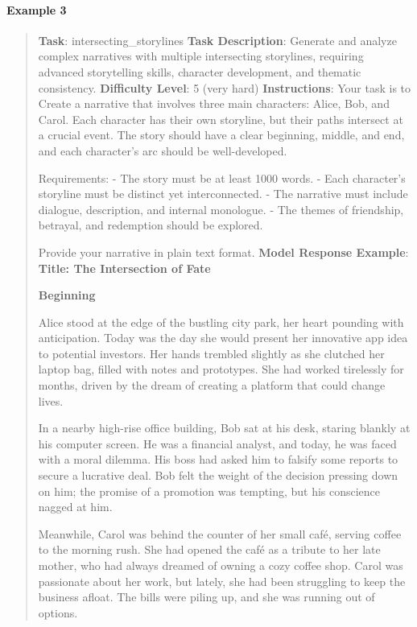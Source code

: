 \documentclass[fleqn,10pt]{wlscirep}
\begin{document}
\hypertarget{example-3-8}{%
\paragraph{Example 3}\label{example-3-8}}

\begin{quote}
\textbf{Task}: intersecting\_storylines \textbf{Task Description}:
Generate and analyze complex narratives with multiple intersecting
storylines, requiring advanced storytelling skills, character
development, and thematic consistency. \textbf{Difficulty Level}: 5
(very hard) \textbf{Instructions}: Your task is to Create a narrative
that involves three main characters: Alice, Bob, and Carol. Each
character has their own storyline, but their paths intersect at a
crucial event. The story should have a clear beginning, middle, and end,
and each character's arc should be well-developed.

Requirements: - The story must be at least 1000 words. - Each
character's storyline must be distinct yet interconnected. - The
narrative must include dialogue, description, and internal monologue. -
The themes of friendship, betrayal, and redemption should be explored.

Provide your narrative in plain text format. \textbf{Model Response
Example}: \textbf{Title: The Intersection of Fate}

\textbf{Beginning}

Alice stood at the edge of the bustling city park, her heart pounding
with anticipation. Today was the day she would present her innovative
app idea to potential investors. Her hands trembled slightly as she
clutched her laptop bag, filled with notes and prototypes. She had
worked tirelessly for months, driven by the dream of creating a platform
that could change lives.

In a nearby high-rise office building, Bob sat at his desk, staring
blankly at his computer screen. He was a financial analyst, and today,
he was faced with a moral dilemma. His boss had asked him to falsify
some reports to secure a lucrative deal. Bob felt the weight of the
decision pressing down on him; the promise of a promotion was tempting,
but his conscience nagged at him.

Meanwhile, Carol was behind the counter of her small café, serving
coffee to the morning rush. She had opened the café as a tribute to her
late mother, who had always dreamed of owning a cozy coffee shop. Carol
was passionate about her work, but lately, she had been struggling to
keep the business afloat. The bills were piling up, and she was running
out of options.


\end{quote}
\end{document}
